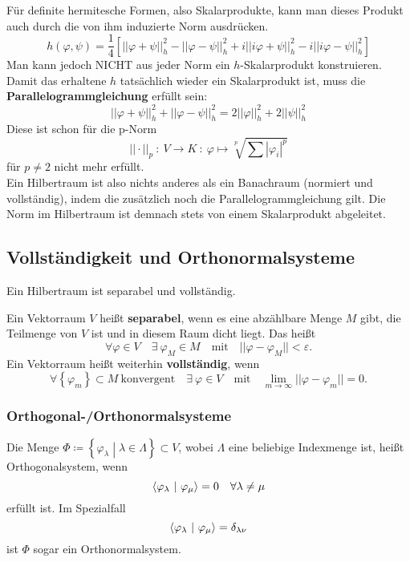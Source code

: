 \documentclass[a4paper,12pt,portrait]{book}
\numberwithin{equation}{section}
\begin{document}
Für definite hermitesche Formen, also Skalarprodukte, kann man dieses Produkt auch durch die von ihm induzierte Norm ausdrücken.
\begin{equation*}
h(\varphi,\psi)=\frac{1}{4}\left[||\varphi+\psi||_h^2 - ||\varphi-\psi||_h^2 + i||i\varphi + \psi||_h^2 - i||i\varphi-\psi||_h^2\right]
\end{equation*}
Man kann jedoch NICHT aus jeder Norm ein $h$-Skalarprodukt konstruieren. Damit das erhaltene $h$ tatsächlich wieder ein Skalarprodukt ist, muss die \textbf{Parallelogrammgleichung} erfüllt sein:
\begin{equation*}
||\varphi+\psi||_h^2 + ||\varphi-\psi||_h^2=2||\varphi||_h^2 + 2||\psi||_h^2
\end{equation*}
Diese ist schon für die p-Norm
\begin{equation*}
||\cdot||_p\ :\ V\rightarrow K\ :\ \varphi\mapsto \sqrt[p]{\sum|\varphi_i|^p}
\end{equation*}
für $p\neq 2$ nicht mehr erfüllt. \\

Ein Hilbertraum ist also nichts anderes als ein Banachraum (normiert und vollständig), indem die zusätzlich noch die Parallelogrammgleichung gilt. Die Norm im Hilbertraum ist demnach stets von einem Skalarprodukt abgeleitet.

\subsection{Vollständigkeit und Orthonormalsysteme}

Ein Hilbertraum ist separabel und vollständig. 

Ein Vektorraum $V$ heißt \textbf{separabel}, wenn es eine abzählbare Menge $M$ gibt, die Teilmenge von $V$ ist und in diesem Raum dicht liegt. Das heißt
\begin{equation*}
\forall\varphi\in V\quad\exists\ \varphi_M\in M \quad\text{mit}\quad ||\varphi-\varphi_M||<\varepsilon.
\end{equation*}
Ein Vektorraum heißt weiterhin \textbf{vollständig}, wenn
\begin{equation*}
\forall \left\lbrace\varphi_m\right\rbrace\subset M\ \text{konvergent} \quad\exists\ \varphi\in V \quad\text{mit}\quad\lim\limits_{m\rightarrow\infty}||\varphi-\varphi_m||=0.
\end{equation*}

\subsubsection{Orthogonal-/Orthonormalsysteme}
Die Menge $\Phi\coloneqq\left\lbrace \varphi_\lambda \middle| \lambda\in\Lambda \right\rbrace\subset V$, wobei $\Lambda$ eine beliebige Indexmenge ist, heißt Orthogonalsystem, wenn
\begin{equation*}
\left\langle \varphi_\lambda \ \middle| \ \varphi_\mu\right\rangle=0 \quad\forall\lambda\neq\mu
\end{equation*}
erfüllt ist. Im Spezialfall
\begin{equation*}
\left\langle \varphi_\lambda \ \middle| \ \varphi_\mu\right\rangle=\delta_{\lambda\nu}
\end{equation*}
ist $\Phi$ sogar ein Orthonormalsystem.
\end{document}
